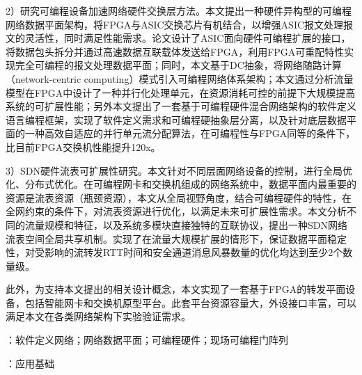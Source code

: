 2）研究可编程设备加速网络硬件交换层方法。本文提出一种硬件异构型的可编程网络数据平面架构，将FPGA与ASIC交换芯片有机结合，以增强ASIC报文处理报文的灵活性，同时满足性能需求。论文设计了ASIC面向硬件可编程扩展的接口，将数据包头拆分并通过高速数据互联载体发送给FPGA，利用FPGA可重配特性实现完全可编程的报文处理数据平面；同时，本文基于DC抽象，将网络随路计算（network-centric computing）模式引入可编程网络体系架构；本文通过分析流量模型在FPGA中设计了一种并行化处理单元，在资源消耗可控的前提下大规模提高系统的可扩展性能；另外本文提出了一套基于可编程硬件混合网络架构的软件定义语言编程框架，实现了软件定义需求和可编程硬抽象层分离，以及针对底层数据平面的一种高效自适应的并行单元流分配算法，在可编程性与FPGA同等的条件下，比目前FPGA交换机性能提升120x。

3）SDN硬件流表可扩展性研究。本文针对不同层面网络设备的控制，进行全局优化、分布式优化。在可编程网卡和交换机组成的网络系统中，数据平面内最重要的资源是流表资源（瓶颈资源），本文从全局视野角度，结合可编程硬件的特性，在全网约束的条件下，对流表资源进行优化，以满足未来可扩展性需求。本文分析不同的流量规模和特征，以及系统多模块直接独特的互联协议，提出一种SDN网络流表空间全局共享机制。实现了在流量大规模扩展的情形下，保证数据平面稳定性，对受影响的流转发RTT时间和安全通道消息风暴数量的优化均达到至少2个数量级。

此外，为支持本文提出的相关设计概念，本文实现了一套基于FPGA的转发平面设备，包括智能网卡和交换机原型平台。此套平台资源容量大，外设接口丰富，可以满足本文在各类网络架构下实验验证需求。


{\boldsong}
\vspace{\baselineskip}
：软件定义网络；网络数据平面；可编程硬件；现场可编程门阵列

\vspace{\baselineskip}
：应用基础


\clearpage


